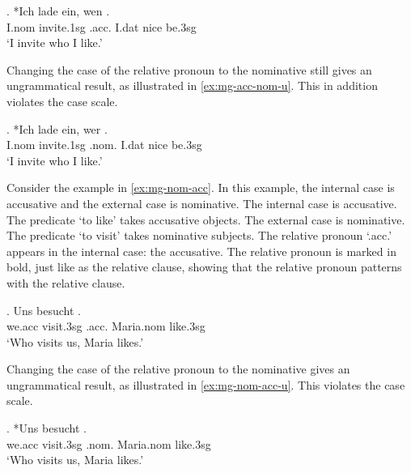 \exg. *Ich {lade ein}, wen   .\\
I.\ac{nom} invite.1\ac{sg}\scsub{[acc]} .\ac{acc}. I.\ac{dat} nice be.3\ac{sg}\scsub{[nom]}\\
`I invite who I like.' \label{ex:mg-acc-nom}

Changing the case of the relative pronoun to the nominative still gives an ungrammatical result, as illustrated in \ref{ex:mg-acc-nom-u}. This in addition violates the case scale.

\exg. *Ich {lade ein}, wer   .\\
I.\ac{nom} invite.1\ac{sg}\scsub{[acc]} .\ac{nom}. I.\ac{dat} nice be.3\ac{sg}\scsub{[nom]}\\
`I invite who I like.' \label{ex:mg-acc-nom-u}

Consider the example in \ref{ex:mg-nom-acc}. In this example, the internal case is accusative and the external case is nominative.
The internal case is accusative. The predicate  `to like' takes accusative objects.
The external case is nominative. The predicate  `to visit' takes nominative subjects.
The relative pronoun  `.\ac{acc}.' appears in the internal case: the accusative. The relative pronoun is marked in bold, just like as the relative clause, showing that the relative pronoun patterns with the relative clause.

\exg. Uns besucht   .\\
 we.\ac{acc} visit.3\ac{sg}\scsub{[nom]} .\ac{acc}. Maria.\ac{nom} like.3\ac{sg}\scsub{[acc]}\\
 `Who visits us, Maria likes.' \label{ex:mg-nom-acc}

Changing the case of the relative pronoun to the nominative gives an ungrammatical result, as illustrated in \ref{ex:mg-nom-acc-u}. This violates the case scale.

\exg. *Uns besucht   .\\
 we.\ac{acc} visit.3\ac{sg}\scsub{[nom]} .\ac{nom}. Maria.\ac{nom} like.3\ac{sg}\scsub{[acc]}\\
 `Who visits us, Maria likes.' \label{ex:mg-nom-acc-u}


